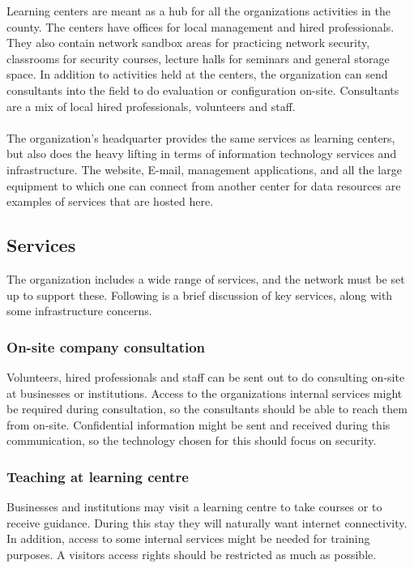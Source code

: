 Learning centers are meant as a hub for all the organizations activities in the county. The centers have offices for local management and hired professionals. They also contain network sandbox areas for practicing network security, classrooms for security courses, lecture halls for seminars and general storage space. In addition to activities held at the centers, the organization can send consultants into the field to do evaluation or configuration on-site. Consultants are a mix of local hired professionals, volunteers and staff.
\\
\\
The organization's headquarter provides the same services as learning centers, but also does the heavy lifting in terms of information technology services and infrastructure. The website, E-mail, management applications, and all the large equipment to which one can connect from another center for data resources are examples of services that are hosted here.

\subsection{Services}

The organization includes a wide range of services, and the network must be set up to support these. Following is a brief discussion of key services, along with some infrastructure concerns.


\subsubsection{On-site company consultation}

Volunteers, hired professionals and staff  can be sent out to do consulting on-site at businesses or institutions. Access to the organizations internal services might be required during consultation, so the consultants should be able to reach them from on-site. Confidential information might be sent and received during this communication, so the technology chosen for this should focus on security.

\subsubsection{Teaching at learning centre}

Businesses and institutions may visit a learning centre to take courses or to receive guidance. During this stay they will naturally want internet connectivity. In addition, access to some internal services might be needed for training purposes. A visitors access rights should be restricted as much as possible.


